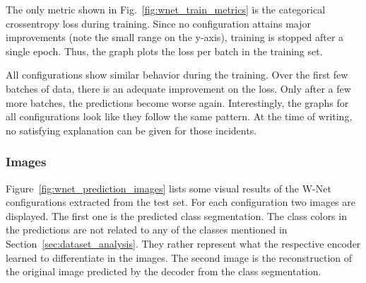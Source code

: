 The only metric shown in Fig.~\ref{fig:wnet_train_metrics} is the categorical crossentropy loss during training. Since no configuration attains major improvements (note the small range on the y-axis), training is stopped after a single epoch. Thus, the graph plots the loss per batch in the training set.

All configurations show similar behavior during the training. Over the first few batches of data, there is an adequate improvement on the loss. Only after a few more batches, the predictions become worse again. Interestingly, the graphs for all configurations look like they follow the same pattern. At the time of writing, no satisfying explanation can be given for those incidents.

\subsubsection{Images}
Figure~\ref{fig:wnet_prediction_images} lists some visual results of the W-Net configurations extracted from the test set. For each configuration two images are displayed. The first one is the predicted class segmentation. The class colors in the predictions are not related to any of the classes mentioned in Section~\ref{sec:dataset_analysis}. They rather represent what the respective encoder learned to differentiate in the images. The second image is the reconstruction of the original image predicted by the decoder from the class segmentation.

